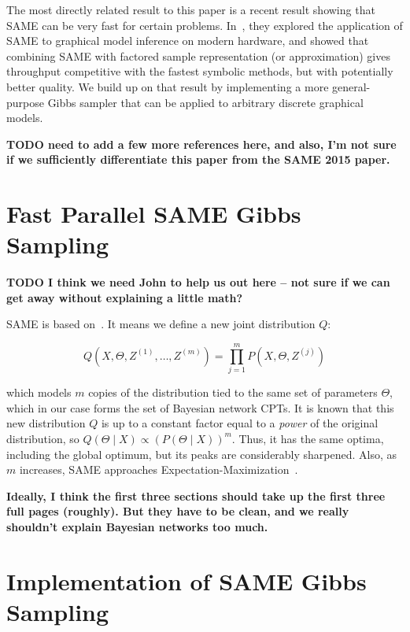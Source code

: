 \documentclass{article} %
\begin{document}
The most directly related result to this paper is a recent result showing that SAME can be very fast
for certain problems. In~\citep{SAME2015}, they explored the application of SAME to graphical model
inference on modern hardware, and showed that combining SAME with factored sample representation
(or approximation) gives throughput competitive with the fastest symbolic methods, but with
potentially better quality. We build up on that result by implementing a more general-purpose Gibbs
sampler that can be applied to arbitrary discrete graphical models.

\textbf{TODO need to add a few more references here, and also, I'm not sure if we sufficiently
differentiate this paper from the SAME 2015 paper.}




\section{Fast Parallel SAME Gibbs Sampling}\label{sec:same}

\textbf{TODO I think we need John to help us out here -- not sure if we can get away without
explaining a little math?}

SAME is based on~\citep{SAME2002}. It means we define a new joint distribution $Q$:

\begin{equation}\label{eq:same}
Q(X,\Theta,Z^{(1)},\ldots,Z^{(m)}) = \prod_{j=1}^m P(X,\Theta,Z^{(j)})
\end{equation}

which models $m$ copies of the distribution tied to the same set of parameters $\Theta$, which in
our case forms the set of Bayesian network CPTs. It is known that this new distribution $Q$ is up to
a constant factor equal to a \emph{power} of the original distribution, so $Q(\Theta \mid X) \propto
(P(\Theta \mid X))^m$. Thus, it has the same optima, including the global optimum, but its peaks are
considerably sharpened. Also, as $m$ increases, SAME approaches
Expectation-Maximization~\citep{EMpaper}.

\textbf{Ideally, I think the first three sections should take up the first three full pages
(roughly). But they have to be clean, and we really shouldn't explain Bayesian networks too much.}




\section{Implementation of SAME Gibbs Sampling}\label{sec:implementation}
\end{document}
